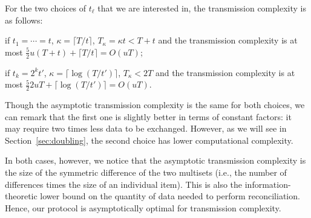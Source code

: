 \documentclass{llncs}
\begin{document}
For the two choices of $t_\ell$ that we are interested in, the transmission complexity is as follows:
\begin{compactitem}
\item if $t_1 = \cdots = t$, $\kappa = \lceil T/t \rceil$, $T_\kappa = \kappa t < T+t$ and the transmission complexity is at most $\frac{5}{2} u (T+t) + \lceil T/t \rceil = O(uT)$;
\item if $t_k = 2^k t'$, $\kappa = \lceil \log(T/t') \rceil$, $T_\kappa < 2T$ and the transmission complexity is at most $\frac{5}{2} 2uT + \lceil \log(T/t') \rceil = O(uT)$.
\end{compactitem}
Though the asymptotic transmission complexity is the same for both choices, we can remark that the first one is slightly better in terms of constant factors: it may require two times less data to be exchanged.
However, as we will see in Section~\ref{sec:doubling}, the second choice has lower computational complexity.

In both cases, however, we notice that the asymptotic transmission complexity is the size of the symmetric difference of the two multisets (i.e., the number of differences times the size of an individual item). This is also the information-theoretic lower bound on the quantity of data needed to perform reconciliation. Hence, our protocol is asymptotically optimal for transmission complexity.
\end{document}
